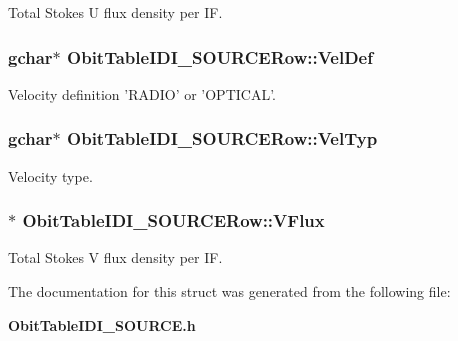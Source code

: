 Total Stokes U flux density per IF. 

\subsubsection{\setlength{\rightskip}{0pt plus 5cm}gchar$\ast$ {\bf Obit\-Table\-IDI\_\-SOURCERow::Vel\-Def}}\label{structObitTableIDI__SOURCERow_o27}


Velocity definition 'RADIO' or 'OPTICAL'. 

\subsubsection{\setlength{\rightskip}{0pt plus 5cm}gchar$\ast$ {\bf Obit\-Table\-IDI\_\-SOURCERow::Vel\-Typ}}\label{structObitTableIDI__SOURCERow_o26}


Velocity type. 

\subsubsection{$\ast$ {\bf Obit\-Table\-IDI\_\-SOURCERow::VFlux}}\label{structObitTableIDI__SOURCERow_o22}


Total Stokes V flux density per IF. 



The documentation for this struct was generated from the following file:\begin{CompactItemize}
\item 
{\bf Obit\-Table\-IDI\_\-SOURCE.h}\end{CompactItemize}
